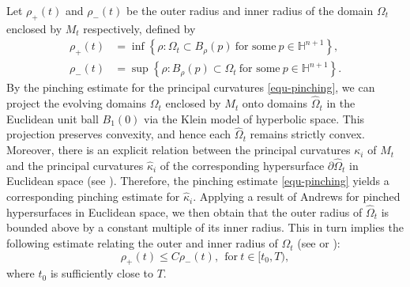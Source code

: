 \documentclass[11pt,reqno]{amsart}
\theoremstyle{remark}
\numberwithin{equation}{section}
\begin{document}
Let $\rho_+(t)$ and $\rho_-(t)$ be the outer radius and inner radius of the domain $\Omega_t$ enclosed by $M_t$ respectively, defined by
\begin{align*}
	\rho_+(t) &= \inf \left\lbrace \rho:\Omega_t\subset B_{\rho}(p)\ \mbox{for some}\ p\in\mathbb{H}^{n+1} \right\rbrace,\\
	\rho_-(t) & = \sup\left\{ \rho:B_{\rho}(p) \subset \Omega_t\ \mbox{for some}\ p\in\mathbb{H}^{n+1} \right\}. 
\end{align*}
By the pinching estimate for the principal curvatures \eqref{equ-pinching}, we can project the evolving domains $\Omega_t$ enclosed by $M_t$ onto domains $\hat{\Omega}_t$ in the Euclidean unit ball $B_1(0)$ via the Klein model of hyperbolic space. This projection preserves convexity, and hence each $\hat{\Omega}_t$ remains strictly convex. Moreover, there is an explicit relation between the principal curvatures $\kappa_i$ of $M_t$ and the principal curvatures $\hat{\kappa}_i$ of the corresponding hypersurface $\partial\hat{\Omega}_t$ in Euclidean space (see \cite[\S 5]{AW18}). Therefore, the pinching estimate \eqref{equ-pinching} yields a corresponding pinching estimate for $\hat{\kappa}_i$. Applying a result of Andrews \cite{And94} for pinched hypersurfaces in Euclidean space, we then obtain that the outer radius of $\hat{\Omega}_t$ is bounded above by a constant multiple of its inner radius. This in turn implies the following estimate relating the outer and inner radius of $\Omega_t$ (see \cite[\S 6]{Ger15} or \cite[\S 6]{Yu16}):
\begin{equation}
	\rho_+(t) \leq C\rho_-(t),\ \ \mbox{for}\ t\in[t_0,T),
	\label{equ-rhopin}
\end{equation}
where $t_0$ is sufficiently close to $T$.
\end{document}
